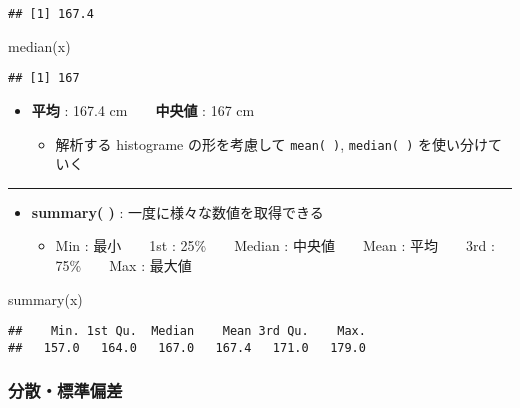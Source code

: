 \documentclass[
]{article}
\newenvironment{Shaded}{\begin{snugshade}}{\end{snugshade}}
\newcommand{\FunctionTok}[1]{\textcolor[rgb]{0.00,0.00,0.00}{#1}}
\newcommand{\NormalTok}[1]{#1}
\providecommand{\tightlist}{%
  \setlength{\itemsep}{0pt}\setlength{\parskip}{0pt}}
\begin{document}
\begin{verbatim}
## [1] 167.4
\end{verbatim}

\begin{Shaded}
\begin{Highlighting}[]
\FunctionTok{median}\NormalTok{(x)}
\end{Highlighting}
\end{Shaded}

\begin{verbatim}
## [1] 167
\end{verbatim}

\begin{itemize}
\item
  \textbf{平均} : 167.4 cm　\textbar{}　\textbf{中央値} : 167 cm

  \begin{itemize}
  \tightlist
  \item
    解析する histograme の形を考慮して \texttt{mean(\ )},
    \texttt{median(\ )} を使い分けていく
  \end{itemize}
\end{itemize}

\begin{center}\rule{0.5\linewidth}{0.5pt}\end{center}

\begin{itemize}
\item
  \textbf{summary( )} : 一度に様々な数値を取得できる

  \begin{itemize}
  \tightlist
  \item
    Min : 最小　\textbar{}　1st : 25\%　\textbar{}　Median :
    中央値　\textbar{}　Mean : 平均　\textbar{}　3rd :
    75\%　\textbar{}　Max : 最大値
  \end{itemize}
\end{itemize}

\begin{Shaded}
\begin{Highlighting}[]
\FunctionTok{summary}\NormalTok{(x)}
\end{Highlighting}
\end{Shaded}

\begin{verbatim}
##    Min. 1st Qu.  Median    Mean 3rd Qu.    Max. 
##   157.0   164.0   167.0   167.4   171.0   179.0
\end{verbatim}

\hypertarget{ux5206ux6563ux6a19ux6e96ux504fux5dee}{%
\subsubsection{分散・標準偏差}\label{ux5206ux6563ux6a19ux6e96ux504fux5dee}}
\end{document}
